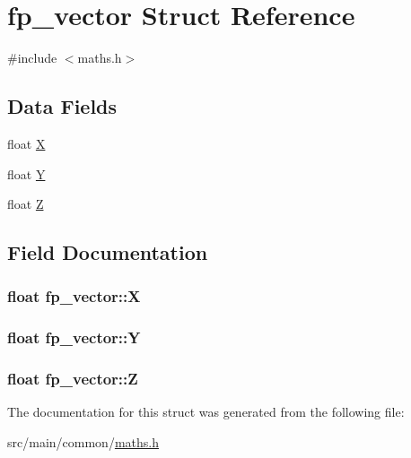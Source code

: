 \hypertarget{structfp__vector}{\section{fp\+\_\+vector Struct Reference}
\label{structfp__vector}
}


{\ttfamily \#include $<$maths.\+h$>$}

\subsection*{Data Fields}
\begin{DoxyCompactItemize}
\item 
float \hyperlink{structfp__vector_a0216988dad5cd66241cfdf83f0ab71c2}{X}
\item 
float \hyperlink{structfp__vector_a88ee48e46b447e53c08c31b39b0f01a6}{Y}
\item 
float \hyperlink{structfp__vector_a699b63c3debe220193583ce20f428b67}{Z}
\end{DoxyCompactItemize}


\subsection{Field Documentation}
\hypertarget{structfp__vector_a0216988dad5cd66241cfdf83f0ab71c2}{
\subsubsection[{X}]{\setlength{\rightskip}{0pt plus 5cm}float fp\+\_\+vector\+::\+X}}\label{structfp__vector_a0216988dad5cd66241cfdf83f0ab71c2}
\hypertarget{structfp__vector_a88ee48e46b447e53c08c31b39b0f01a6}{
\subsubsection[{Y}]{\setlength{\rightskip}{0pt plus 5cm}float fp\+\_\+vector\+::\+Y}}\label{structfp__vector_a88ee48e46b447e53c08c31b39b0f01a6}
\hypertarget{structfp__vector_a699b63c3debe220193583ce20f428b67}{
\subsubsection[{Z}]{\setlength{\rightskip}{0pt plus 5cm}float fp\+\_\+vector\+::\+Z}}\label{structfp__vector_a699b63c3debe220193583ce20f428b67}


The documentation for this struct was generated from the following file\+:\begin{DoxyCompactItemize}
\item 
src/main/common/\hyperlink{maths_8h}{maths.\+h}\end{DoxyCompactItemize}
